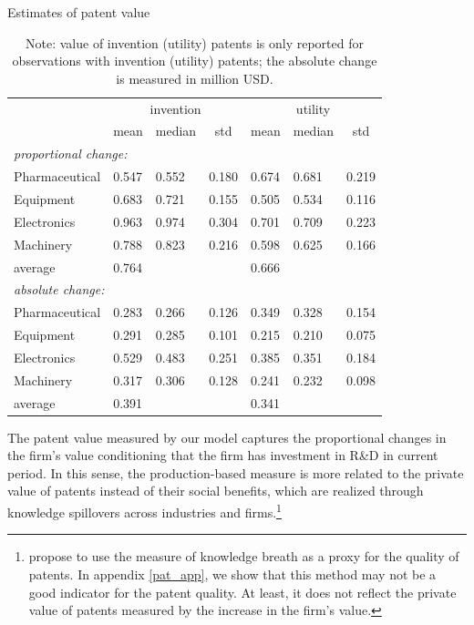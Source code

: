 \documentclass[11pt]{article}
\begin{document}
\begin{table}[h]
    \centering
    \caption{Estimates of patent value}
    \label{T18}
    \begin{tabular}{lllcllc}
    \toprule
                         &\multicolumn{3}{c}{invention} &\multicolumn{3}{c}{utility} \\
                            & mean  & median & std   & mean            & median & std   \\
    \hline
    \multicolumn{7}{l}{\textit{proportional change:}} \\
    Pharmaceutical & 0.547 & 0.552 & 0.180 & 0.674 & 0.681 & 0.219 \\
    Equipment      & 0.683 & 0.721 & 0.155 & 0.505 & 0.534 & 0.116 \\
    Electronics    & 0.963 & 0.974 & 0.304 & 0.701 & 0.709 & 0.223 \\
    Machinery      & 0.788 & 0.823 & 0.216 & 0.598 & 0.625 & 0.166 \\
    average        & 0.764 &       &       & 0.666 &       &       \\
    \hline
    \multicolumn{7}{l}{\textit{absolute change:}} \\
    Pharmaceutical & 0.283 & 0.266 & 0.126 & 0.349 & 0.328 & 0.154 \\
    Equipment      & 0.291 & 0.285 & 0.101 & 0.215 & 0.210 & 0.075 \\
    Electronics    & 0.529 & 0.483 & 0.251 & 0.385 & 0.351 & 0.184 \\
    Machinery      & 0.317 & 0.306 & 0.128 & 0.241 & 0.232 & 0.098 \\
    average        & 0.391 &       &       & 0.341 &       &       \\ \bottomrule
    \end{tabular}
    \caption*{\small{}Note: value of invention (utility) patents is only reported for observations with invention (utility) patents; the absolute change is measured in million USD.}{\small \par}
    \end{table}

The patent value measured by our model captures the proportional changes in the firm's value conditioning that the firm has investment in R\&D in current period. In this sense, the production-based measure is more related to the private value of patents instead of their social benefits, which are realized through knowledge spillovers across industries and firms.\footnote{\citet{Dang2015} propose to use the measure of knowledge breath as a proxy for the quality of patents. In appendix \ref{pat_app}, we show that this method may not be a good indicator for the patent quality. At least, it does not reflect the private value of patents measured by the increase in the firm's value.}
\end{document}
